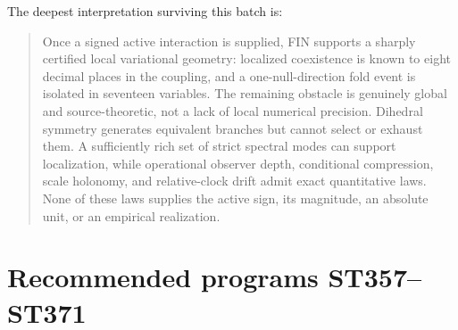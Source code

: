 \documentclass[11pt,a4paper]{article}
\begin{document}
The deepest interpretation surviving this batch is:
\begin{quote}
Once a signed active interaction is supplied, FIN supports a sharply certified local
variational geometry: localized coexistence is known to eight decimal places in the
coupling, and a one-null-direction fold event is isolated in seventeen variables. The
remaining obstacle is genuinely global and source-theoretic, not a lack of local numerical
precision. Dihedral symmetry generates equivalent branches but cannot select or exhaust
them. A sufficiently rich set of strict spectral modes can support localization, while
operational observer depth, conditional compression, scale holonomy, and relative-clock
drift admit exact quantitative laws. None of these laws supplies the active sign, its
magnitude, an absolute unit, or an empirical realization.
\end{quote}

\section{Recommended programs ST357--ST371}
\end{document}
